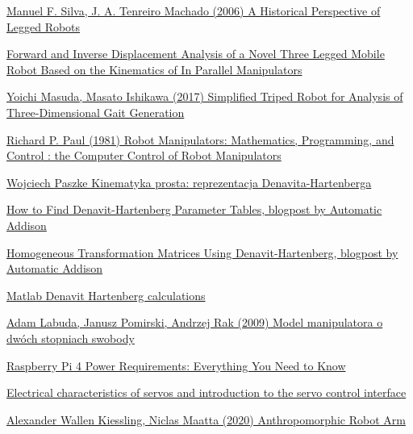 \documentclass[a4paper,13pt]{article}
\begin{document}
\begin{thebibliography}{9}

\href{https://www.researchgate.net/publication/258995388_A_Historical_Perspective_of_Legged_Robots}{Manuel F. Silva, J. A. Tenreiro Machado (2006) A Historical Perspective of Legged Robots}

\href{http://www.romela.org/wp-content/uploads/2015/05/Forward-and-Inverse-Displacement-Analysis-of-a-Novel-Three-Legged-Mobile-Robot-Based-on-the-Kinematics-of-In-Parallel-Manipulators.pdf}{Forward and Inverse Displacement Analysis of a Novel Three Legged Mobile Robot Based on the Kinematics of In Parallel Manipulators}

\href{https://www.jstage.jst.go.jp/article/jrobomech/29/3/29_528/_pdf}{Yoichi Masuda, Masato Ishikawa (2017) Simplified Triped Robot for Analysis of Three-Dimensional Gait Generation}

\href{https://books.google.pl/books?id=UzZ3LAYqvRkC&redir_esc=y}{Richard P. Paul (1981) Robot Manipulators: Mathematics, Programming, and Control : the Computer Control of Robot Manipulators}

\href{http://staff.uz.zgora.pl/wpaszke/materialy/air/PRwyklad_4.pdf}{Wojciech Paszke Kinematyka prosta: reprezentacja Denavita-Hartenberga}

\href{https://automaticaddison.com/how-to-find-denavit-hartenberg-parameter-tables/}{How to Find Denavit-Hartenberg Parameter Tables, blogpost by Automatic Addison}

\href{https://automaticaddison.com/homogeneous-transformation-matrices-using-denavit-hartenberg/}{Homogeneous Transformation Matrices Using Denavit-Hartenberg, blogpost by Automatic Addison}

\href{./DH_calculations.m}{Matlab Denavit Hartenberg calculations}

\href{https://sj.umg.edu.pl/sites/default/files/ZN20.pdf}{Adam Labuda, Janusz Pomirski, Andrzej Rak (2009) Model manipulatora o dwóch stopniach swobody}

\href{https://raspberryexpert.com/raspberry-pi-4-power-requirements/}{Raspberry Pi 4 Power Requirements: Everything You Need to Know}

\href{https://www.pololu.com/blog/16/electrical-characteristics-of-servos-and-introduction-to-the-servo-control-interface}{Electrical characteristics of servos and introduction to the servo control interface}


\bibitem{}
\href{https://www.diva-portal.org/smash/get/diva2:1462059/FULLTEXT01.pdf}{Alexander Wallen Kiessling, Niclas Maatta (2020) Anthropomorphic Robot Arm}

\end{thebibliography}
\end{document}
